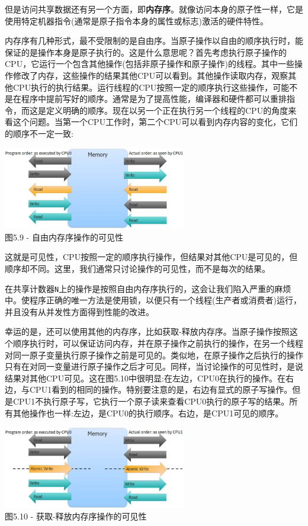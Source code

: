 但是访问共享数据还有另一个方面，即\textbf{内存序}。就像访问本身的原子性一样，它是使用特定机器指令(通常是原子指令本身的属性或标志)激活的硬件特性。

内存序有几种形式，最不受限制的是自由序。当原子操作以自由的顺序执行时，能保证的是操作本身是原子执行的。这是什么意思呢？首先考虑执行原子操作的CPU，它运行一个包含其他操作(包括非原子操作和原子操作)的线程。其中一些操作修改了内存，这些操作的结果其他CPU可以看到。其他操作读取内存，观察其他CPU执行的执行结果。运行线程的CPU按照一定的顺序执行这些操作，可能不是在程序中提前写好的顺序。通常是为了提高性能，编译器和硬件都可以重排指令，而这是定义明确的顺序。现在以另一个正在执行另一个线程的CPU的角度来看这个问题。当第一个CPU工作时，第二个CPU可以看到内存内容的变化，它们的顺序不一定一致:

\begin{center}
\includegraphics[width=0.6\textwidth]{content/1/chapter5/images/9.jpg}\\
图5.9 - 自由内存序操作的可见性
\end{center}

这就是可见性，CPU按照一定的顺序执行操作，但结果对其他CPU是可见的，但顺序却不同。这里，我们通常只讨论操作的可见性，而不是每次的结果。

在共享计数器\texttt{N}上的操作是按照自由内存序执行的，这会让我们陷入严重的麻烦中。使程序正确的唯一方法是使用锁，以便只有一个线程(生产者或消费者)运行，并且没有从并发性方面得到性能的改进。

幸运的是，还可以使用其他的内存序，比如获取-释放内存序。当原子操作按照这个顺序执行时，可以保证访问内存，并在原子操作之前执行的操作，在另一个线程对同一原子变量执行原子操作之前是可见的。类似地，在原子操作之后执行的操作只有在对同一变量进行原子操作之后才可见。同样，当讨论操作的可见性时，是说结果对其他CPU可见。这在图5.10中很明显:在左边，CPU0在执行的操作。在右边，与CPU1看到的相同的操作。特别要注意的是，右边有显式的原子写操作。但是CPU1不执行原子写，它执行一个原子读来查看CPU0执行的原子写的结果。所有其他操作也一样:左边，是CPU0的执行顺序。右边，是CPU1可见的顺序。

\begin{center}
\includegraphics[width=0.6\textwidth]{content/1/chapter5/images/10.jpg}\\
图5.10 - 获取-释放内存序操作的可见性
\end{center}

